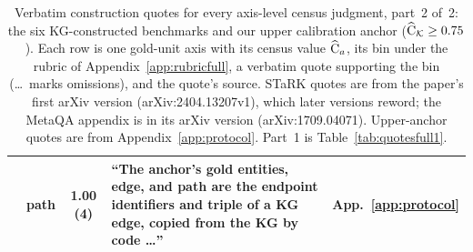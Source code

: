 \begin{table}[p]
\begin{tabular}{@{}p{}p{}cp{}p{}@{}}
 & path & 1.00 (4) & ``The anchor's gold entities, edge, and path are the endpoint identifiers and triple of a KG edge, copied from the KG by code \ldots'' & \raggedright App.~\ref{app:protocol}\tabularnewline
\bottomrule
\end{tabular}
\caption{Verbatim construction quotes for every axis-level census judgment, part~2 of~2: the six KG-constructed benchmarks and our upper calibration anchor ($\widehat{\mathrm{C}}_{\mathcal{K}}\geq0.75$). Each row is one gold-unit axis with its census value $\widehat{\mathrm{C}}_a$, its bin under the rubric of Appendix~\ref{app:rubricfull}, a verbatim quote supporting the bin (\ldots\ marks omissions), and the quote's source. STaRK quotes are from the paper's first arXiv version (arXiv:2404.13207v1), which later versions reword; the MetaQA appendix is in its arXiv version (arXiv:1709.04071). Upper-anchor quotes are from Appendix~\ref{app:protocol}. Part~1 is Table~\ref{tab:quotesfull1}.}
\label{tab:quotesfull2}
\end{table}

